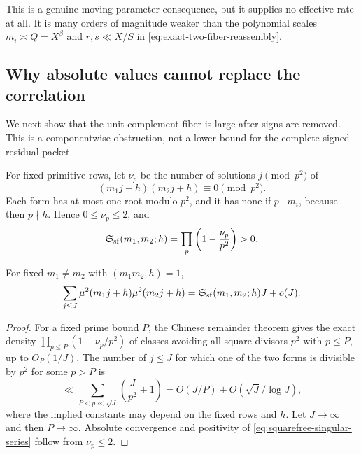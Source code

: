 This is a genuine moving-parameter consequence, but it supplies no
effective rate at all.  It is many orders of magnitude weaker than
the polynomial scales \(m_i\asymp Q=X^\beta\) and
\(r,s\ll X/S\) in \eqref{eq:exact-two-fiber-reassembly}.

\subsection{Why absolute values cannot replace the correlation}

We next show that the unit-complement fiber is large after signs are
removed.  This is a componentwise obstruction, not a lower bound for
the complete signed residual packet.

For fixed primitive rows, let \(\nu_p\) be the number of solutions
\(j\pmod{p^2}\) of
\begin{equation}
 (m_1j+h)(m_2j+h)\equiv0\pmod{p^2}.
 \label{eq:nu-p}
\end{equation}
Each form has at most one root modulo \(p^2\), and it has none if
\(p\mid m_i\), because then \(p\nmid h\).  Hence \(0\le\nu_p\le2\),
and
\begin{equation}
 \mathfrak S_{\rm sf}(m_1,m_2;h)
 =\prod_p\left(1-\frac{\nu_p}{p^2}\right)>0.
 \label{eq:squarefree-singular-series}
\end{equation}

\begin{lemma}
\label{lem:simultaneous-squarefree}
For fixed \(m_1\ne m_2\) with \((m_1m_2,h)=1\),
\begin{equation}
 \sum_{j\le J}
 \mu^2(m_1j+h)\mu^2(m_2j+h)
 =\mathfrak S_{\rm sf}(m_1,m_2;h)J+o(J).
 \label{eq:simultaneous-squarefree}
\end{equation}
\end{lemma}

\begin{proof}
For a fixed prime bound \(P\), the Chinese remainder theorem gives the
exact density
\(\prod_{p\le P}(1-\nu_p/p^2)\) of classes avoiding all square
divisors \(p^2\) with \(p\le P\), up to \(O_P(1/J)\).  The number of
\(j\le J\) for which one of the two forms is divisible by \(p^2\) for
some \(p>P\) is
\[
 \ll\sum_{P<p\ll\sqrt J}\left(\frac J{p^2}+1\right)
 =O(J/P)+O(\sqrt J/\log J),
\]
where the implied constants may depend on the fixed rows and \(h\).
Let \(J\to\infty\) and then \(P\to\infty\).  Absolute convergence and
positivity of
\eqref{eq:squarefree-singular-series} follow from \(\nu_p\le2\).
\end{proof}


